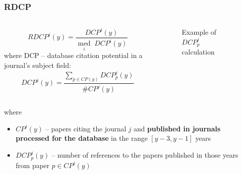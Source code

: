 \documentclass{beamer}
\begin{document}
\begin{frame}
    \frametitle{RDCP}
    \begin{columns}[T]
        \begin{column}{.5\textwidth}
            \[
                RDCP^j(y) = \frac{DCP^j(y)}{\operatorname*{med}\limits_{i} \; {DCP^i(y)}}
            \]
            where DCP -- database citation
            potential in a journal’s subject field:
            \[
                DCP^j(y) = \frac{\sum\limits_{p \in CP(y)} DCP^j_p(y)}{\# CP^j(y)}
            \]
        \end{column}
        \begin{column}{.5\textwidth}
            \begin{figure}[ht]
                \caption{Example of $DCP^j_p$ calculation}
            \end{figure}
        \end{column}
    \end{columns}
    where
    \begin{itemize}
        \item $CP^j(y)$ -- papers  citing the
              journal $j$ and \textbf{published in
                  journals processed for the
                  database} in the range $[y-3, y-1]$ years
        \item $DCP^j_p(y)$ -- number of references to the
              papers published in those years
              from paper $p \in CP^j(y)$
    \end{itemize}
\end{frame}
\end{document}
